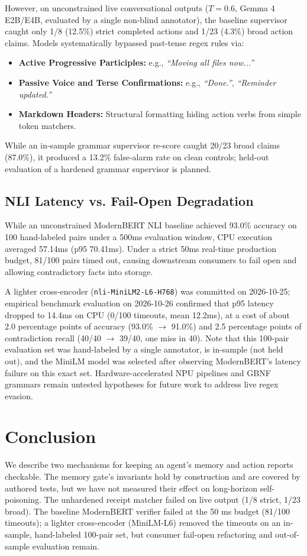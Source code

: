 \documentclass[10pt,twocolumn]{article}
\begin{document}
However, on unconstrained live conversational outputs ($T=0.6$, Gemma 4 E2B/E4B, evaluated by a single non-blind annotator), the baseline supervisor caught only 1/8 (12.5\%) strict completed actions and 1/23 (4.3\%) broad action claims. Models systematically bypassed past-tense regex rules via:
\begin{itemize}
    \item \textbf{Active Progressive Participles:} e.g., \textit{``Moving all files now...''}
    \item \textbf{Passive Voice and Terse Confirmations:} e.g., \textit{``Done.''}, \textit{``Reminder updated.''}
    \item \textbf{Markdown Headers:} Structural formatting hiding action verbs from simple token matchers.
\end{itemize}
While an in-sample grammar supervisor re-score caught 20/23 broad claims (87.0\%), it produced a 13.2\% false-alarm rate on clean controls; held-out evaluation of a hardened grammar supervisor is planned.

\subsection{NLI Latency vs. Fail-Open Degradation}
While an unconstrained ModernBERT NLI baseline achieved 93.0\% accuracy on 100 hand-labeled pairs under a 500ms evaluation window, CPU execution averaged 57.14ms (p95 70.41ms). Under a strict 50ms real-time production budget, 81/100 pairs timed out, causing downstream consumers to fail open and allowing contradictory facts into storage.

A lighter cross-encoder (\texttt{nli-MiniLM2-L6-H768}) was committed on 2026-10-25; empirical benchmark evaluation on 2026-10-26 confirmed that p95 latency dropped to 14.4ms on CPU (0/100 timeouts, mean 12.2ms), at a cost of about 2.0 percentage points of accuracy (93.0\% $\to$ 91.0\%) and 2.5 percentage points of contradiction recall (40/40 $\to$ 39/40, one miss in 40). Note that this 100-pair evaluation set was hand-labeled by a single annotator, is in-sample (not held out), and the MiniLM model was selected after observing ModernBERT's latency failure on this exact set. Hardware-accelerated NPU pipelines and GBNF grammars remain untested hypotheses for future work to address live regex evasion.

\section{Conclusion}
We describe two mechanisms for keeping an agent's memory and action reports checkable. The memory gate's invariants hold by construction and are covered by authored tests, but we have not measured their effect on long-horizon self-poisoning. The unhardened receipt matcher failed on live output (1/8 strict, 1/23 broad). The baseline ModernBERT verifier failed at the 50 ms budget (81/100 timeouts); a lighter cross-encoder (MiniLM-L6) removed the timeouts on an in-sample, hand-labeled 100-pair set, but consumer fail-open refactoring and out-of-sample evaluation remain.
\end{document}
